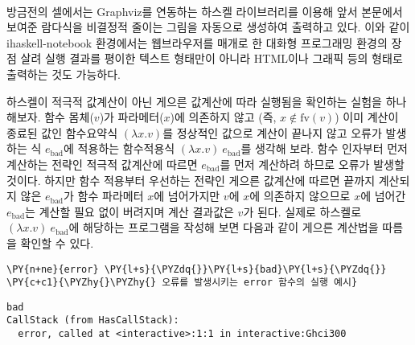     \begin{center}
    \end{center}
    { \hspace*{\fill} \\}
    
    방금전의 셀에서는 Graphviz를 연동하는 하스켈 라이브러리를 이용해 앞서
본문에서 보여준 람다식을 비결정적 줄이는 그림을 자동으로 생성하여
출력하고 있다. 이와 같이 ihaskell-notebook 환경에서는 웹브라우저를
매개로 한 대화형 프로그래밍 환경의 장점 살려 실행 결과를 평이한 텍스트
형태만이 아니라 HTML이나 그래픽 등의 형태로 출력하는 것도 가능하다.

    하스켈이 적극적 값계산이 아닌 게으른 값계산에 따라 실행됨을 확인하는
실험을 하나 해보자. 함수 몸체(\(v\))가 파라메터(\(x\))에 의존하지 않고
(즉, \(x\notin\mathrm{fv}(v)\)) 이미 계산이 종료된 값인 함수요약식
\((\lambda x.v)\)를 정상적인 값으로 계산이 끝나지 않고 오류가 발생하는
식 \(e_\textrm{bad}\)에 적용하는 함수적용식
\((\lambda x.v)~e_\textrm{bad}\)를 생각해 보라. 함수 인자부터 먼저
계산하는 전략인 적극적 값계산에 따르면 \(e_\textrm{bad}\)를 먼저
계산하려 하므로 오류가 발생할 것이다. 하지만 함수 적용부터 우선하는
전략인 게으른 값계산에 따르면 끝까지 계산되지 않은 \(e_\textrm{bad}\)가
함수 파라메터 \(x\)에 넘어가지만 \(v\)에 \(x\)에 의존하지 않으므로
\(x\)에 넘어간 \(e_\textrm{bad}\)는 계산할 필요 없이 버려지며 계산
결과값은 \(v\)가 된다. 실제로 하스켈로
\((\lambda x.v)~e_\textrm{bad}\)에 해당하는 프로그램을 작성해 보면
다음과 같이 게으른 계산법을 따름을 확인할 수 있다.

    \begin{tcolorbox}[breakable, size=fbox, boxrule=1pt, pad at break*=1mm,colback=cellbackground, colframe=cellborder, top=.75ex]
\begin{Verbatim}[commandchars=\\\{\}]
\PY{n+ne}{error} \PY{l+s}{\PYZdq{}}\PY{l+s}{bad}\PY{l+s}{\PYZdq{}}                 \PY{c+c1}{\PYZhy{}\PYZhy{} 오류를 발생시키는 error 함수의 실행 예시}
\end{Verbatim}
\end{tcolorbox}

    \begin{Verbatim}[commandchars=\\\{\}, frame=single, framerule=1mm, rulecolor=\color{outerrorbackground}]
bad
CallStack (from HasCallStack):
  error, called at <interactive>:1:1 in interactive:Ghci300
    \end{Verbatim}

